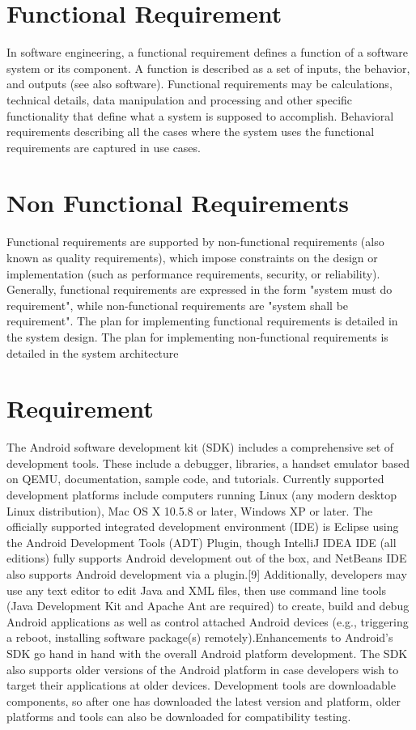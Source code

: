 	
	
	
	\section{Functional Requirement}
	In software engineering, a functional requirement defines a function of a software system or its component. A function is described as a set of inputs, the behavior, and outputs (see also software). Functional requirements may be calculations, technical details, data manipulation and processing and other specific functionality that define what a system is supposed to accomplish. Behavioral requirements describing all the cases where the system uses the functional requirements are captured in use cases.
	
	
	\section{Non Functional Requirements}
	Functional requirements are supported by non-functional requirements (also known as quality requirements), which impose constraints on the design or implementation (such as performance requirements, security, or reliability). Generally, functional requirements are expressed in the form "system must do requirement", while non-functional requirements are "system shall be requirement". The plan for implementing functional requirements is detailed in the system design. The plan for implementing non-functional requirements is detailed in the system architecture
	
	
	
	
	
	\section{Requirement}
	
	
	
	The Android software development kit (SDK) includes a comprehensive set of development tools. These include a debugger, libraries, a handset emulator based on QEMU, documentation, sample code, and tutorials. Currently supported development platforms include computers running Linux (any modern desktop Linux distribution), Mac OS X 10.5.8 or later, Windows XP or later. The officially supported integrated development environment (IDE) is Eclipse using the Android Development Tools (ADT) Plugin, though IntelliJ IDEA IDE (all editions) fully supports Android development out of the box, and NetBeans IDE also supports Android development via a plugin.[9] Additionally, developers may use any text editor to edit Java and XML files, then use command line tools (Java Development Kit and Apache Ant are required) to create, build and debug Android applications as well as control attached Android devices (e.g., triggering a reboot, installing software package(s) remotely).Enhancements to Android's SDK go hand in hand with the overall Android platform development. The SDK also supports older versions of the Android platform in case developers wish to target their applications at older devices. Development tools are downloadable components, so after one has downloaded the latest version and platform, older platforms and tools can also be downloaded for compatibility testing.
	
